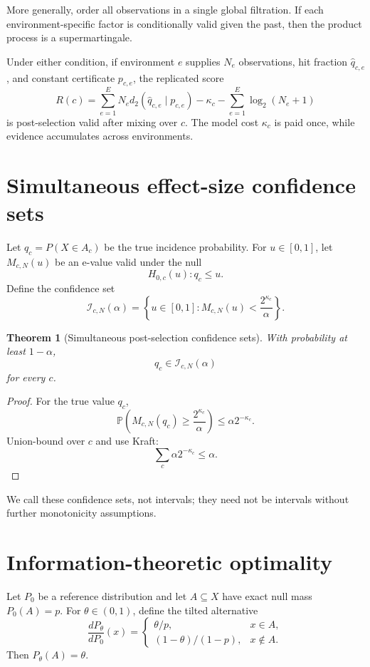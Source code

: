 \documentclass[11pt]{article}
\newtheorem{theorem}{Theorem}[section]
\begin{document}
More generally, order all observations in a single global filtration. If each environment-specific factor is conditionally valid given the past, then the product process is a supermartingale.

Under either condition, if environment $e$ supplies $N_e$ observations, hit fraction $\widehat q_{c,e}$, and constant certificate $p_{c,e}$, the replicated score
\[
R(c)
=
\sum_{e=1}^{E}
N_e d_2(\widehat q_{c,e}\mid p_{c,e})
-\kappa_c
-\sum_{e=1}^{E}\log_2(N_e+1)
\]
is post-selection valid after mixing over $c$. The model cost $\kappa_c$ is paid once, while evidence accumulates across environments.

\section{Simultaneous effect-size confidence sets}

Let $q_c=P(X\in A_c)$ be the true incidence probability. For $u\in[0,1]$, let $M_{c,N}(u)$ be an e-value valid under the null
\[
H_{0,c}(u):q_c\le u.
\]
Define the confidence set
\[
\mathcal I_{c,N}(\alpha)
=
\left\{
u\in[0,1]:
M_{c,N}(u)<\frac{2^{\kappa_c}}{\alpha}
\right\}.
\]

\begin{theorem}[Simultaneous post-selection confidence sets]
With probability at least $1-\alpha$,
\[
q_c\in \mathcal I_{c,N}(\alpha)
\]
for every $c$.
\end{theorem}

\begin{proof}
For the true value $q_c$,
\[
\mathbb P\left(
M_{c,N}(q_c)\ge\frac{2^{\kappa_c}}{\alpha}
\right)
\le
\alpha 2^{-\kappa_c}.
\]
Union-bound over $c$ and use Kraft:
\[
\sum_c \alpha2^{-\kappa_c}\le\alpha.
\]
\end{proof}

We call these confidence sets, not intervals; they need not be intervals without further monotonicity assumptions.

\section{Information-theoretic optimality}

Let $P_0$ be a reference distribution and let $A\subseteq X$ have exact null mass $P_0(A)=p$. For $\theta\in(0,1)$, define the tilted alternative
\[
\frac{dP_\theta}{dP_0}(x)
=
\begin{cases}
\theta/p,&x\in A,\\
(1-\theta)/(1-p),&x\notin A.
\end{cases}
\]
Then $P_\theta(A)=\theta$.
\end{document}
